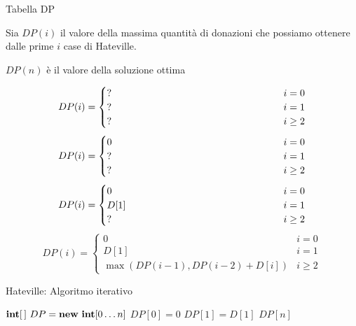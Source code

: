 \begin{frame}{Tabella DP}

\vspace{-9pt}
\begin{myboxtitle}
\BIL
\item Sia $DP(i)$ il \alert{valore} della massima quantità di donazioni che possiamo
ottenere dalle prime $i$ case di Hateville. 
\item $DP(n)$ è il valore della soluzione ottima
\EIL
\end{myboxtitle}

\begin{overprint}
\[
  DP(i) =
  \begin{cases}
   \makebox[6cm][l]{?} & i = 0 \\
   \makebox[6cm][l]{?} & i = 1 \\
   \makebox[6cm][l]{?} & i \geq 2 
   \end{cases}
\]
\[
  DP(i) =
  \begin{cases}
   0 & i = 0 \\
  \makebox[6cm][l]{?} & i = 1 \\
  \makebox[6cm][l]{?} & i \geq 2 
   \end{cases}
\]
\[
  DP(i) =
  \begin{cases}
   0 & i = 0 \\
   D[1] & i = 1 \\
  \makebox[6cm][l]{?} & i \geq 2 
   \end{cases}
\]
\[
  DP(i) =
  \begin{cases}
   0 & i = 0 \\
   D[1] & i = 1 \\
   \max(DP(i-1), DP(i-2) + D[i]) & i \geq 2 
   \end{cases}
\]
\end{overprint}

\end{frame}

\begin{frame}{Hateville: Algoritmo iterativo}

\vspace{-9pt}

\pause
\begin{Procedure}
\caption[A]{\textsf{hateville}($\INTEGER[\,]\ D$, \INTEGER $n$)}
$\INTEGER[\,]\ DP = \NEW\ \INTEGER[0 \ldots n]$\;
$DP[0] = 0$\;
$DP[1] = D[1]$\;
\Return $DP[n]$\;
\end{Procedure}

\end{frame}

